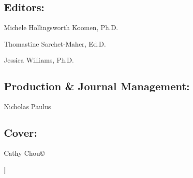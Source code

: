 \documentclass[11.5pt]{sig-alternate}
\begin{document}
\begin{large}
\begin{@twocolumnfalse}
\subsection*{Editors:}
Michele Hollingsworth Koomen, Ph.D.

Thomastine Sarchet-Maher, Ed.D.

Jessica Williams, Ph.D.

\subsection*{Production \& Journal Management:}
Nicholas Paulus

\subsection*{Cover:}
Cathy Chou©
\end{@twocolumnfalse}]
\end{large}
\end{document}
